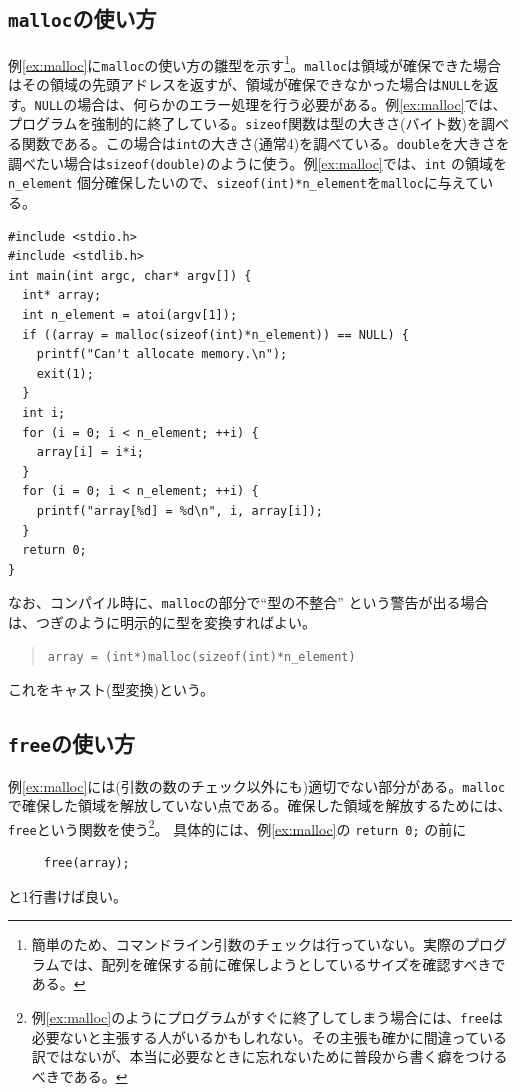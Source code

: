\subsection{{\tt malloc}の使い方}
例\ref{ex:malloc}に\verb|malloc|の使い方の雛型を示す\footnote{簡単のため、コマンドライン引数のチェックは行っていない。実際のプログラムでは、配列を確保する前に確保しようとしているサイズを確認すべきである。}。\verb|malloc|は領域が確保できた場合はその領域の先頭アドレスを返すが、領域が確保できなかった場合は\verb|NULL|を返す。\verb|NULL|の場合は、何らかのエラー処理を行う必要がある。例\ref{ex:malloc}では、プログラムを強制的に終了している。\verb|sizeof|関数は型の大きさ(バイト数)を調べる関数である。この場合は\verb|int|の大きさ(通常4)を調べている。\verb|double|を大きさを調べたい場合は\verb|sizeof(double)|のように使う。例\ref{ex:malloc}では、\verb|int| の領域を \verb|n_element| 個分確保したいので、\verb|sizeof(int)*n_element|を\verb|malloc|に与えている。
%
\begin{reidai}\label{ex:malloc}
\begin{verbatim}
#include <stdio.h>
#include <stdlib.h>
int main(int argc, char* argv[]) {
  int* array;
  int n_element = atoi(argv[1]);
  if ((array = malloc(sizeof(int)*n_element)) == NULL) {
    printf("Can't allocate memory.\n");
    exit(1);
  }
  int i;
  for (i = 0; i < n_element; ++i) {
    array[i] = i*i;
  }
  for (i = 0; i < n_element; ++i) {
    printf("array[%d] = %d\n", i, array[i]);
  }
  return 0;
}
\end{verbatim}
\end{reidai} \noindent
なお、コンパイル時に、{\tt malloc}の部分で``型の不整合'' という警告が出る場合は、つぎのように明示的に型を変換すればよい。
\begin{quote}
\begin{verbatim}
array = (int*)malloc(sizeof(int)*n_element)
\end{verbatim}
\end{quote}
これをキャスト(型変換)という。
%
\subsection{{\tt free}の使い方}
例\ref{ex:malloc}には(引数の数のチェック以外にも)適切でない部分がある。\verb|malloc|で確保した領域を解放していない点である。確保した領域を解放するためには、\verb|free|という関数を使う\footnote{例\ref{ex:malloc}のようにプログラムがすぐに終了してしまう場合には、{\tt free}は必要ないと主張する人がいるかもしれない。その主張も確かに間違っている訳ではないが、本当に必要なときに忘れないために普段から書く癖をつけるべきである。}。
具体的には、例\ref{ex:malloc}の \verb|return 0;| の前に
%
\begin{verbatim}
     free(array);
\end{verbatim}
%
と1行書けば良い。

